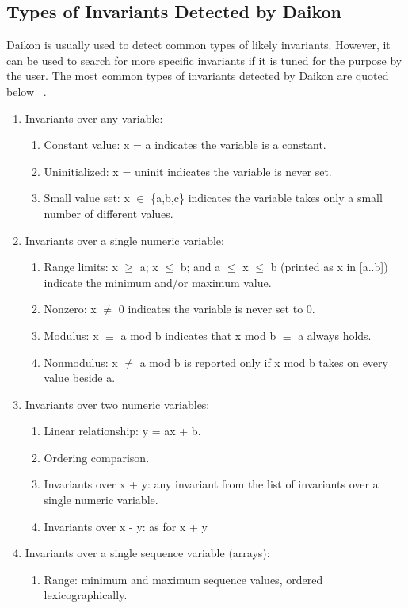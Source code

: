 \subsection{Types of Invariants Detected by Daikon}
Daikon is usually used to detect common types of likely invariants. However, it can be used to search for more specific invariants if it is tuned for the purpose by the user. The most common types of invariants detected by Daikon are quoted below ~\cite{ernst2001dynamically}. 
\begin{enumerate}
\item Invariants over any variable: 
	\begin{enumerate}
	 \item Constant value: x = a indicates the variable is a constant.
	 \item Uninitialized: x = uninit indicates the variable is never set.
	 \item Small value set: x $\in$ \{a,b,c\} indicates the variable takes only a small number of different values.
	\end{enumerate}
\item Invariants over a single numeric variable: 
	\begin{enumerate}
	\item Range limits: x $\ge$ a; x $\le$ b; and a $\le$ x $\le$ b (printed as x in [a..b]) indicate the minimum and/or maximum value.
	\item Nonzero: x $\ne$ 0 indicates the variable is never set to 0. 
	\item Modulus: x $\equiv$ a mod b indicates that x mod b $\equiv$ a always holds.
	\item Nonmodulus: x $\ne$ a mod b is reported only if x mod b takes on every value beside a.
	\end{enumerate}
\item Invariants over two numeric variables: 
	\begin{enumerate}
	\item Linear relationship: y = ax + b. 
	\item Ordering comparison. 
	\item Invariants over x + y: any invariant from the list of invariants over a single numeric variable.
	\item Invariants over x - y: as for x + y
	\end{enumerate}
\item Invariants over a single sequence variable (arrays): 
	\begin{enumerate}
	\item Range: minimum and maximum sequence values, ordered lexicographically. 

\end{enumerate}
\end{enumerate}
